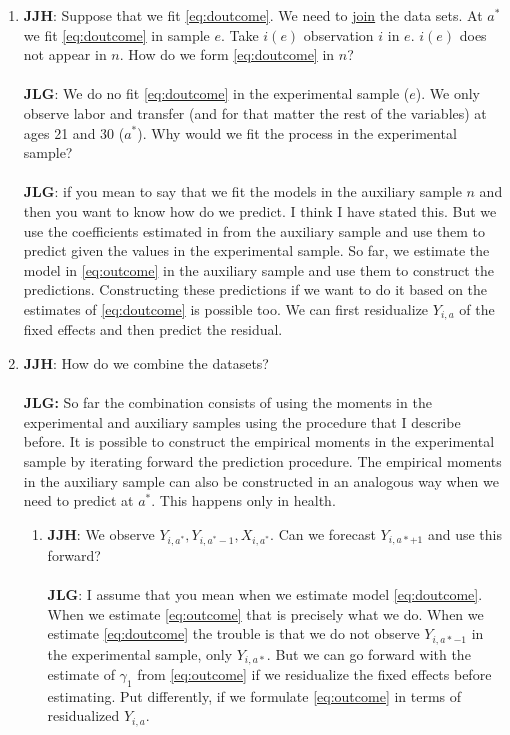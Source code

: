 \begin{enumerate}
\item \textbf{JJH}: Suppose that we fit \eqref{eq:doutcome}. We need to \underline{join} the data sets. At $a^*$ we fit \eqref{eq:doutcome} in sample $e$. Take $i(e)$ observation $i$ in $e$. $i(e)$ does not appear in $n$. How do we form \eqref{eq:doutcome} in $n$?\\ \\
\noindent \textbf{JLG}: We do no fit \eqref{eq:doutcome} in the experimental sample ($e$). We only observe labor and transfer (and for that matter the rest of the variables) at ages 21 and 30 ($a^*$). Why would we fit the process in the experimental sample? \\ \\
\noindent \textbf{JLG}: if you mean to say that we fit the models in the auxiliary sample $n$ and then you want to know how do we predict. I think I have stated this. But we use the coefficients estimated in from the auxiliary sample and use them to predict given the values in the experimental sample. So far, we estimate the model in \eqref{eq:outcome} in the auxiliary sample and use them to construct the predictions. Constructing these predictions if we want to do it based on the estimates of \eqref{eq:doutcome} is possible too. We can first residualize $Y_{i,a}$ of the fixed effects and then predict the residual.\\ 

\item \textbf{JJH}: How do we combine the datasets?\\ \\ 
\textbf{JLG:} So far the combination consists of using the moments in the experimental and auxiliary samples using the procedure that I describe before. It is possible to construct the empirical moments in the experimental sample by iterating forward the prediction procedure. The empirical moments in the auxiliary sample can also be constructed in an analogous way when we need to predict at $a^*$. This happens only in health. 

\begin{enumerate}
\item \textbf{JJH}: We observe $Y_{i,a^*}, Y_{i,a^*-1}, X_{i,a^*}$. Can we forecast $Y_{i,a*+1}$ and use this forward? \\ \\
\noindent \textbf{JLG}: I assume that you mean when we estimate model \eqref{eq:doutcome}. When we estimate \eqref{eq:outcome} that is precisely what we do. When we estimate \eqref{eq:doutcome} the trouble is that we do not observe $Y_{i,a*-1}$ in the experimental sample, only $Y_{i,a*}$. But we can go forward with the estimate of $\gamma_{1}$ from \eqref{eq:outcome} if we residualize the fixed effects before estimating. Put differently, if we formulate \eqref{eq:outcome} in terms of residualized $Y_{i,a}$.\\


\end{enumerate}
\end{enumerate}
